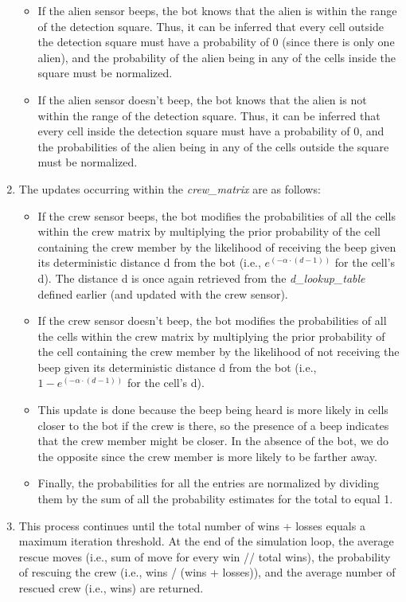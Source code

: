 \documentclass[11pt]{article}
\begin{document}
\begin{enumerate}
    \begin{itemize}
        \item If the alien sensor beeps, the bot knows that the alien is within the range of the detection square. Thus, it can be inferred that every cell outside the detection square must have a probability of 0 (since there is only one alien), and the probability of the alien being in any of the cells inside the square must be normalized.
        \item If the alien sensor doesn't beep, the bot knows that the alien is not within the range of the detection square. Thus, it can be inferred that every cell inside the detection square must have a probability of 0, and the probabilities of the alien being in any of the cells outside the square must be normalized.
    \end{itemize}
    \item The updates occurring within the \emph{crew\_matrix} are as follows:
    \begin{itemize}
        \item If the crew sensor beeps, the bot modifies the probabilities of all the cells within the crew matrix by multiplying the prior probability of the cell containing the crew member by the likelihood of receiving the beep given its deterministic distance d from the bot (i.e., $e^{(-\alpha \cdot (d - 1))}$ for the cell's d). The distance d is once again retrieved from the \emph{d\_lookup\_table} defined earlier (and updated with the crew sensor).
        \item If the crew sensor doesn't beep, the bot modifies the probabilities of all the cells within the crew matrix by multiplying the prior probability of the cell containing the crew member by the likelihood of not receiving the beep given its deterministic distance d from the bot (i.e., $1 - e^{(-\alpha \cdot (d - 1))}$ for the cell's d).
        \item This update is done because the beep being heard is more likely in cells closer to the bot if the crew is there, so the presence of a beep indicates that the crew member might be closer. In the absence of the bot, we do the opposite since the crew member is more likely to be farther away.
        \item Finally, the probabilities for all the entries are normalized by dividing them by the sum of all the probability estimates for the total to equal 1.
    \end{itemize}
    \item This process continues until the total number of wins + losses equals a maximum iteration threshold. At the end of the simulation loop, the average rescue moves (i.e., sum of move for every win // total wins), the probability of rescuing the crew (i.e., wins / (wins + losses)), and the average number of rescued crew (i.e., wins) are returned.
\end{enumerate}
\end{document}
